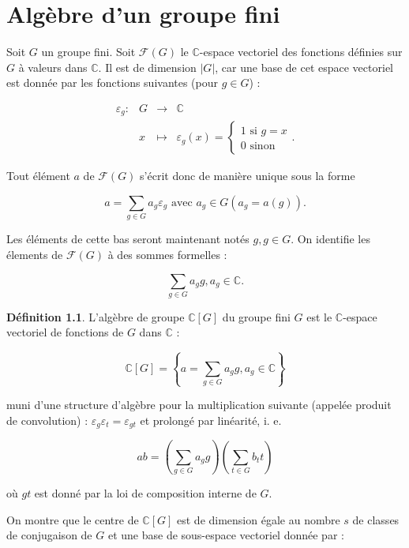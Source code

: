 \documentclass[french]{book}
\theoremstyle{definition}
\newtheorem{protodefinition}{Définition}[section]
\newenvironment{definition}
    {\colorlet{shadecolor}{green!5}\begin{shaded}\begin{protodefinition}}
    {\end{protodefinition}\end{shaded}}
\begin{document}
\chapter{Algèbre d'un groupe fini}

Soit \(G\) un groupe fini. Soit \(\mathscr{F}(G)\) le \(\mathbb{C}\)-espace vectoriel des fonctions définies sur \(G\) à valeurs dans \(\mathbb{C}\). Il est de dimension \(\left\lvert G \right\rvert\), car une base de cet espace vectoriel est donnée par les fonctions suivantes (pour \(g \in G\)) :

\[\begin{matrix}
\varepsilon_g : & G & \longrightarrow & \mathbb{C} \\
\ & x & \longmapsto & \varepsilon_g(x) = \begin{cases}
  1 \text{ si } g = x \\
  0 \text{ sinon }
\end{cases}.
\end{matrix}\]

Tout élément \(a\) de \(\mathscr{F}(G)\) s'écrit donc de manière unique sous la forme

\[a = \sum_{g \in G} a_g \varepsilon_g \text{ avec } a_g \in G (a_g = a(g)).\]

Les éléments de cette bas seront maintenant notés \(g, g \in G\). On identifie les élements de \(\mathscr{F}(G)\) à des sommes formelles :

\[\sum_{g \in G} a_g g, a_g \in \mathbb{C}.\]

\begin{definition}
  L'algèbre de groupe \(\mathbb{C}[G]\) du groupe fini \(G\) est le \(\mathbb{C}\)-espace vectoriel de fonctions de \(G\) dans \(\mathbb{C}\) :

  \[\mathbb{C}[G] = \left\{ a =\sum_{g \in G} a_g g, a_g \in \mathbb{C}\right\}\]

  muni d'une structure d'algèbre pour la multiplication suivante (appelée produit de convolution) : \(\varepsilon_g \varepsilon_t = \varepsilon _{gt}\) et prolongé par linéarité, i. e.

  \[ab = \left(\sum_{g \in G} a_g g \right) \left(\sum_{t \in G} b_t t \right)\]

  où \(gt\) est donné par la loi de composition interne de \(G\).
\end{definition}

On montre que le centre de \(\mathbb{C}[G]\) est de dimension égale au nombre \(s\) de classes de conjugaison de \(G\) et une base de sous-espace vectoriel donnée par :
\end{document}

